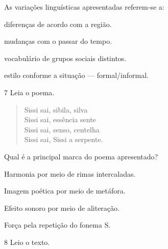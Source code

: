 As variações linguísticas apresentadas referem-se a:

\begin{escolha}
\item diferenças de acordo com a região.

\item mudanças com o passar do tempo.

\item vocabulário de grupos sociais distintos.

\item estilo conforme a situação --- formal/informal.
\end{escolha}


\num{7} Leia o poema.

\begin{verse}
Sissi sai, sibila, silva\\
Sissi sai, essência sente\\
Sissi sai, senso, centelha\\
Sissi sai, Sissi a serpente.

\end{verse}

Qual é a principal marca do poema apresentado?

\begin{escolha}
\item Harmonia por meio de rimas intercaladas.

\item Imagem poética por meio de metáfora.

\item Efeito sonoro por meio de aliteração.

\item Força pela repetição do fonema S.
\end{escolha}


\num{8} Leio o texto.

